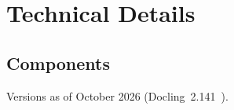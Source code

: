 \chapter{Technical Details}
\label{app:details}

\section{Components}
\label{app:components}

Versions as of October 2026 (Docling~2.141~\cite{docling2026pypi}).

\newcommand\lic[1]{\tikz[baseline=(b.base)]\node[draw=black!35, rounded corners=1.5pt,
  inner sep=1.2pt, font=\tiny] (b) {#1};}

\begingroup
\captionsetup{hypcap=false}
\label{tab:components}
\small
\renewcommand\arraystretch{1.2}
